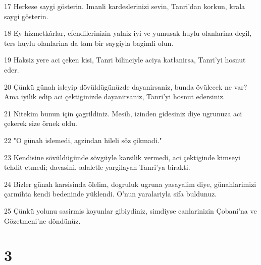 \par 17 Herkese saygi gösterin. Imanli kardeslerinizi sevin, Tanri'dan korkun, krala saygi gösterin.
\par 18 Ey hizmetkârlar, efendilerinizin yalniz iyi ve yumusak huylu olanlarina degil, ters huylu olanlarina da tam bir saygiyla bagimli olun.
\par 19 Haksiz yere aci çeken kisi, Tanri bilinciyle aciya katlanirsa, Tanri'yi hosnut eder.
\par 20 Çünkü günah isleyip dövüldügünüzde dayanirsaniz, bunda övülecek ne var? Ama iyilik edip aci çektiginizde dayanirsaniz, Tanri'yi hosnut edersiniz.
\par 21 Nitekim bunun için çagrildiniz. Mesih, izinden gidesiniz diye ugrunuza aci çekerek size örnek oldu.
\par 22 "O günah islemedi, agzindan hileli söz çikmadi."
\par 23 Kendisine sövüldügünde sövgüyle karsilik vermedi, aci çektiginde kimseyi tehdit etmedi; davasini, adaletle yargilayan Tanri'ya birakti.
\par 24 Bizler günah karsisinda ölelim, dogruluk ugruna yasayalim diye, günahlarimizi çarmihta kendi bedeninde yüklendi. O'nun yaralariyla sifa buldunuz.
\par 25 Çünkü yolunu sasirmis koyunlar gibiydiniz, simdiyse canlarinizin Çobani'na ve Gözetmeni'ne döndünüz.

\chapter{3}

